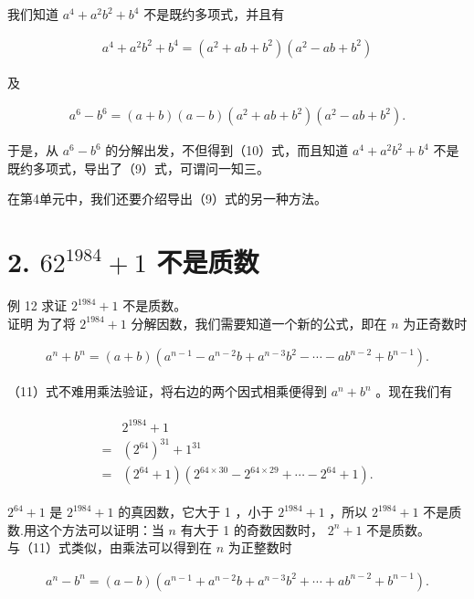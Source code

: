 \documentclass[10pt]{article}
\begin{document}
我们知道 $a^{4}+a^{2} b^{2}+b^{4}$ 不是既约多项式，并且有

\begin{align*}
a^{4}+a^{2} b^{2}+b^{4}=\left(a^{2}+a b+b^{2}\right)\left(a^{2}-a b+b^{2}\right) \tag{9}
\end{align*}

及

\begin{align*}
a^{6}-b^{6}=(a+b)(a-b)\left(a^{2}+a b+b^{2}\right)\left(a^{2}-a b+b^{2}\right) . \tag{10}
\end{align*}

于是，从 $a^{6}-b^{6}$ 的分解出发，不但得到（10）式，而且知道 $a^{4}+a^{2} b^{2}+b^{4}$ 不是既约多项式，导出了（9）式，可谓问一知三。

在第4单元中，我们还要介绍导出（9）式的另一种方法。

\section*{2. $62^{1984}+1$ 不是质数}
例 12 求证 $2^{1984}+1$ 不是质数。\\
证明 为了将 $2^{1984}+1$ 分解因数，我们需要知道一个新的公式，即在 $n$ 为正奇数时

\begin{align*}
a^{n}+b^{n}=(a+b)\left(a^{n-1}-a^{n-2} b+a^{n-3} b^{2}-\cdots-a b^{n-2}+b^{n-1}\right) . \tag{11}
\end{align*}

（11）式不难用乘法验证，将右边的两个因式相乘便得到 $a^{n}+b^{n}$ 。现在我们有

\begin{align*}
\begin{aligned}
& 2^{1984}+1 \\
= & \left(2^{64}\right)^{31}+1^{31} \\
= & \left(2^{64}+1\right)\left(2^{64 \times 30}-2^{64 \times 29}+\cdots-2^{64}+1\right) .
\end{aligned}
\end{align*}

$2^{64}+1$ 是 $2^{1984}+1$ 的真因数，它大于 1 ，小于 $2^{1984}+1$ ，所以 $2^{1984}+1$ 不是质数.用这个方法可以证明：当 $n$ 有大于 1 的奇数因数时， $2^{n}+1$ 不是质数。\\
与（11）式类似，由乘法可以得到在 $n$ 为正整数时

\begin{align*}
a^{n}-b^{n}=(a-b)\left(a^{n-1}+a^{n-2} b+a^{n-3} b^{2}+\cdots+a b^{n-2}+b^{n-1}\right) . \tag{12}
\end{align*}
\end{document}
